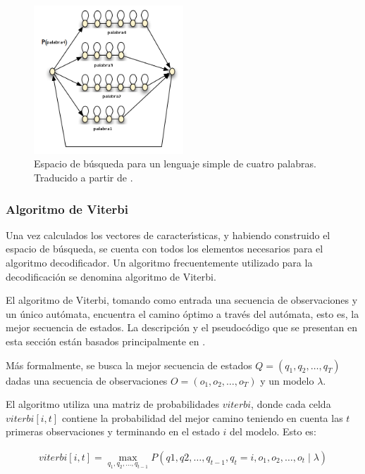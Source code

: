 \begin{figure}[H] 
\centering
\includegraphics[width=0.5\textwidth]{./graphics/espacio.png}
\caption{Espacio de b\'usqueda para un lenguaje simple de cuatro palabras. Traducido a partir de \cite{RenalsSearch}.}
\label{figure:espacio-busqueda}
\end{figure}



\subsubsection{Algoritmo de Viterbi}
Una vez calculados los vectores de caracter{\'\i}sticas, y habiendo construido el espacio de b\'usqueda, se cuenta con
todos los elementos necesarios para el algoritmo decodificador. Un algoritmo frecuentemente utilizado para
la decodificaci\'on se denomina algoritmo de Viterbi.

El algoritmo de Viterbi, tomando como entrada una secuencia de observaciones y un \'unico aut\'omata, 
encuentra el camino \'optimo a trav\'es del aut\'omata, esto es, la mejor secuencia de estados. 
La descripci\'on y el pseudoc\'odigo que se presentan en esta secci\'on
est\'an basados principalmente en \cite{Jurafsky, Rabiner89atutorial}.

M\'as formalmente, se busca la mejor secuencia de estados $Q = (q_1,q_2,\ldots,q_T)$ 
dadas una secuencia de observaciones $O = (o_1,o_2,\ldots,o_T)$ y un modelo $\lambda$.

El algoritmo utiliza una matriz de probabilidades $viterbi$, donde cada celda $viterbi[i,t]$ 
contiene la probabilidad del mejor camino teniendo en cuenta las $t$ primeras observaciones y 
terminando en el estado $i$ del modelo. Esto es:

\begin{align}
	viterbi[i,t] = \displaystyle \max_{q_1,q_2,\ldots,q_{t - 1}} P(q1,q2,\ldots,q_{t - 1},
		q_t = i,o_1,o_2,\ldots,o_t \mid \lambda) 	
\end{align} 

